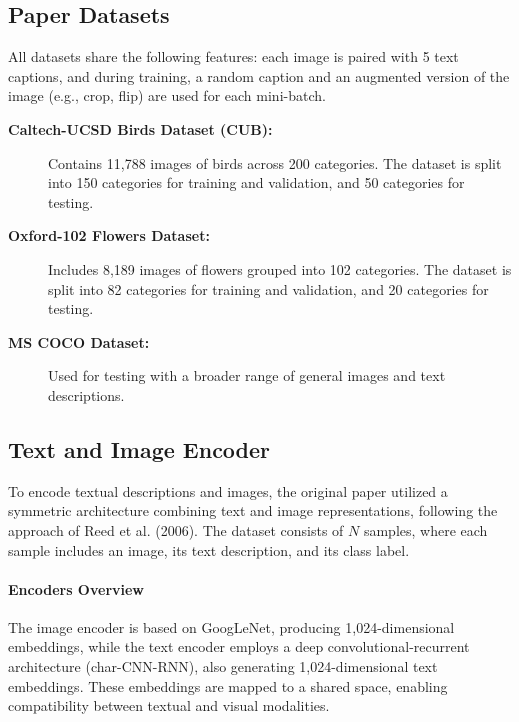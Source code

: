 \subsection*{Paper Datasets}
All datasets share the following features: each image is paired with 5 text captions, 
and during training, a random caption and an augmented version of the image (e.g., crop, flip) 
are used for each mini-batch.

\begin{description}
    \item[\textbf{Caltech-UCSD Birds Dataset (CUB):}] 
    Contains 11,788 images of birds across 200 categories. The dataset is split into 150 categories 
    for training and validation, and 50 categories for testing.
    
    \item[\textbf{Oxford-102 Flowers Dataset:}] Includes 8,189 images of flowers grouped into 102 categories. 
    The dataset is split into 82 categories for training and validation, and 20 categories for testing.
    
    \item[\textbf{MS COCO Dataset:}] Used for testing with a broader range of general images and text descriptions.
\end{description}


\subsection*{Text and Image Encoder}

To encode textual descriptions and images, the original paper utilized a symmetric 
architecture combining text and image representations, following the approach of Reed et al. (2006). 
The dataset consists of $N$ samples, where each sample includes an image, 
its text description, and its class label. 

\paragraph{Encoders Overview}
The image encoder is based on GoogLeNet, producing 1,024-dimensional embeddings, 
while the text encoder employs a deep convolutional-recurrent architecture (char-CNN-RNN), 
also generating 1,024-dimensional text embeddings. 
These embeddings are mapped to a shared space, enabling 
compatibility between textual and visual modalities.

